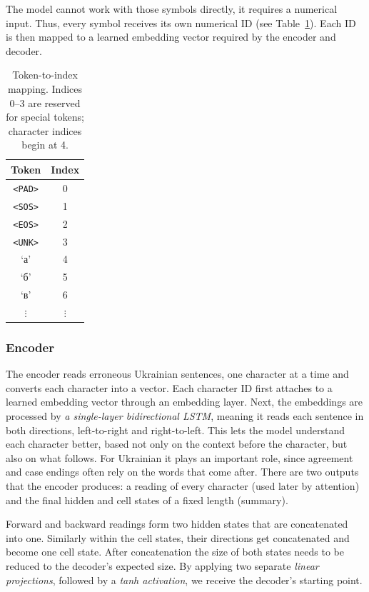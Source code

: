 \documentclass[11pt]{article}
\begin{document}
The model cannot work with those symbols directly, it requires a numerical input. Thus, every symbol receives its own numerical ID (see Table~\ref{tab:vocab-example}). Each ID is then mapped to a learned embedding vector required by the encoder and decoder.
\begin{table}[h]
\centering
\begin{tabular}{cc}
\hline
\textbf{Token} & \textbf{Index} \\
\hline
\texttt{<PAD>} & 0 \\
\texttt{<SOS>} & 1 \\
\texttt{<EOS>} & 2 \\
\texttt{<UNK>} & 3 \\
\hline
\foreignlanguage{ukrainian}{`а'} & 4 \\
\foreignlanguage{ukrainian}{`б'} & 5 \\
\foreignlanguage{ukrainian}{`в'} & 6 \\
$\vdots$ & $\vdots$ \\
\hline
\end{tabular}
\caption{Token-to-index mapping. Indices 0--3 are reserved for special tokens; character indices begin at 4.}
\label{tab:vocab-example}
\end{table}


\subsubsection{Encoder}

 The encoder reads erroneous Ukrainian sentences, one character at a time and converts each character into a vector. Each character ID first attaches to a learned embedding vector through an embedding layer. Next, the embeddings are processed by  \emph{a single-layer bidirectional LSTM}, meaning it reads each sentence in both directions, left-to-right and right-to-left. This lets the model understand each character better, based not only on the context before the character, but also on what follows. For Ukrainian it plays an important role, since agreement and case endings often rely on the words that come after. There are two outputs that the encoder produces: a reading of every character (used later by attention) and the final hidden and cell states of a fixed length (summary). 
 
 Forward and backward readings form two hidden states that are concatenated into one. Similarly within the cell states, their directions get concatenated and become one cell state. After concatenation the size of both states needs to be reduced to the decoder's expected size. By applying two separate  \emph{linear projections}, followed by a  \emph{tanh activation}, we receive the decoder's starting point.
\end{document}
